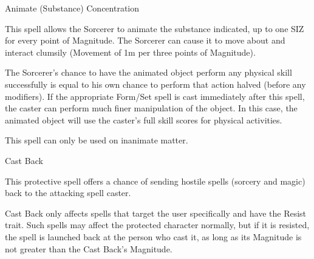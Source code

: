 \begin{samepage}
\begin{rpg-spell}
{Animate (Substance)}
{Concentration}

This spell allows the Sorcerer to animate the substance indicated, up to one SIZ for every point of Magnitude. The Sorcerer can cause it to move about and interact clumsily (Movement of 1m per three points of Magnitude). 

The Sorcerer’s chance to have the animated object perform any physical skill successfully is equal to his own chance to perform that action halved (before any modifiers). If the appropriate Form/Set spell is cast immediately after this spell, the caster can perform much finer manipulation of the object. In this case, the animated object will use the caster’s full skill scores for physical activities. 

This spell can only be used on inanimate matter. 
\end{rpg-spell}
\end{samepage}


\begin{samepage}
\begin{rpg-spell}
{Cast Back}
{}

This protective spell offers a chance of sending hostile spells (sorcery and magic) back to the attacking spell caster. 

Cast Back only affects spells that target the user specifically and have the Resist trait. Such spells may affect the protected character normally, but if it is resisted, the spell is launched back at the person who cast it, as long as its Magnitude is not greater than the Cast Back’s Magnitude. 
\end{rpg-spell}
\end{samepage}


